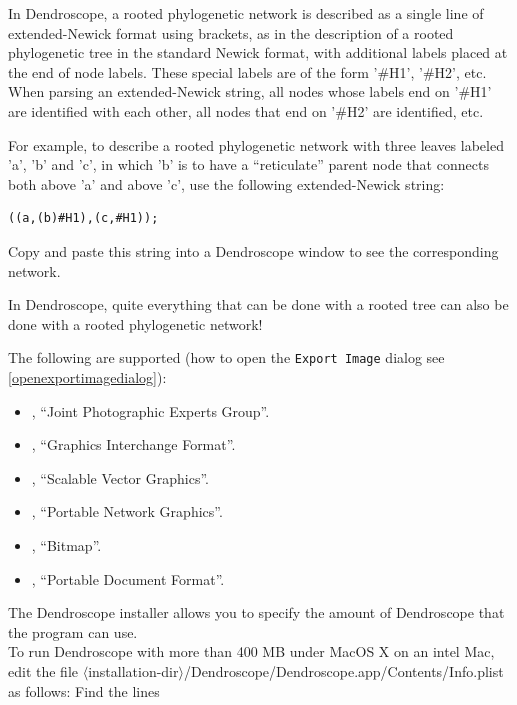 \documentclass[11pt]{article}
\newcommand{\cs}[1]{\textcolor{red}{#1}}
\begin{document}
In Dendroscope, a rooted phylogenetic network is described as a single line of extended-Newick format using brackets, as in the
description of a rooted phylogenetic tree in the standard Newick format, with additional
labels placed at the end of node labels. These special labels are of the form
'\#H1', '\#H2', etc. When parsing an extended-Newick string, all nodes whose labels end on '\#H1' are identified
with each other, all nodes that end on '\#H2' are identified, etc.

For example, to describe a rooted phylogenetic network with three leaves labeled 'a', 'b' and 'c',
in which 'b' is to have a ``reticulate'' parent node that connects both above 'a' and above 'c',
use the following extended-Newick string:
\begin{verbatim}
((a,(b)#H1),(c,#H1));
\end{verbatim}
Copy and paste this string into a Dendroscope window to see the corresponding network.

In Dendroscope, quite everything that can be done with a rooted tree can also be done with a rooted phylogenetic network!

The following  are supported (how to open the \texttt{Export Image} dialog see \ref{openexportimagedialog}):

\begin{itemize}
\item {}, ``Joint Photographic Experts Group''.
\item {}, ``Graphics Interchange Format''.
\item {}, ``Scalable Vector Graphics''.
\item {}, ``Portable Network Graphics''.
\item {}, ``Bitmap''.
\item {}, ``Portable Document Format''. %
\end{itemize}



The Dendroscope installer allows you to specify the amount of Dendroscope that the
program can use. \\

To run Dendroscope with more than 400 MB under MacOS X on an intel
Mac, edit the file $\langle$installation-dir$\rangle$/Dendroscope/Dendroscope.app/Contents/Info.plist as follows: Find the lines
\end{document}
